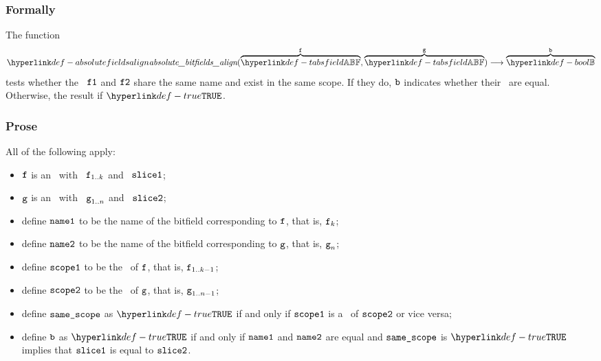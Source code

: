 \subsubsection{Formally}
\begin{mathpar}
\end{mathpar}

\hypertarget{def-absolutefieldsalign}{}
The function
\[
\absolutebitfieldsalign(\overname{\TAbsField}{\vf}, \overname{\TAbsField}{\vg})
\aslto \overname{\Bool}{\vb}
\]
tests whether the \absolutebitfields\ $\vfone$ and $\vftwo$ share the same name
and exist in the same scope. If they do, $\vb$ indicates whether their \absoluteslices\
are equal. Otherwise, the result if $\True$.

\subsubsection{Prose}
All of the following apply:
\begin{itemize}
  \item $\vf$ is an \absolutebitfield\ with \absolutename\ $\vf_{1..k}$ and \absoluteslice\ $\vsliceone$;
  \item $\vg$ is an \absolutebitfield\ with \absolutename\ $\vg_{1..n}$ and \absoluteslice\ $\vslicetwo$;
  \item define $\nameone$ to be the name of the bitfield corresponding to $\vf$, that is, $\vf_k$;
  \item define $\nametwo$ to be the name of the bitfield corresponding to $\vg$, that is, $\vg_n$;
  \item define $\vscopeone$ to be the \bitfieldscope\ of $\vf$, that is, $\vf_{1..k-1}$;
  \item define $\vscopetwo$ to be the \bitfieldscope\ of $\vg$, that is, $\vg_{1..n-1}$;
  \item define $\vsamescope$ as $\True$ if and only if $\vscopeone$ is a \listprefixterm\ of $\vscopetwo$ or vice versa;
  \item define $\vb$ as $\True$ if and only if $\nameone$ and $\nametwo$ are equal and $\vsamescope$ is $\True$ implies
        that $\vsliceone$ is equal to $\vslicetwo$.
\end{itemize}

